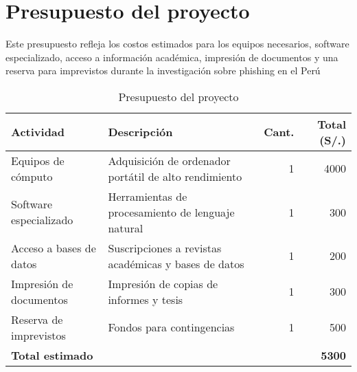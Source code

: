 \chapter{Presupuesto del proyecto}
Este presupuesto refleja los costos estimados para los equipos necesarios, software especializado, acceso a información académica, impresión de documentos y una reserva para imprevistos durante la investigación sobre phishing en el Perú

\begin{table}[h]
    \centering
    
    \begin{tabular}{|l|p{7cm}|r|r|}
    \hline
    \textbf{Actividad}            & \textbf{Descripción}                                        & \textbf{Cant.} & \textbf{Total (S/.)} \\ \hline
    Equipos de cómputo            & Adquisición de ordenador portátil de alto rendimiento        & 1              & 4000                 \\ \hline
    Software especializado        & Herramientas de procesamiento de lenguaje natural           & 1              & 300                  \\ \hline
    Acceso a bases de datos       & Suscripciones a revistas académicas y bases de datos        & 1              & 200                  \\ \hline
    Impresión de documentos       & Impresión de copias de informes y tesis                     & 1              & 300                  \\ \hline
    Reserva de imprevistos        & Fondos para contingencias                                   & 1              & 500                  \\ \hline
    \textbf{Total estimado}       &                                                           &                & \textbf{5300}         \\ \hline
    \end{tabular}
    \label{tab:presupuesto}
    \caption{Presupuesto del proyecto}
    \end{table}
